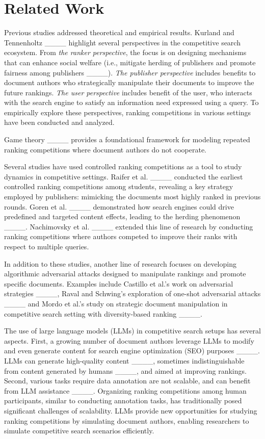 \section{Related Work}
Previous studies addressed theoretical and empirical results. Kurland and Tennenholtz ____ highlight several perspectives in the competitive search ecosystem. From \textit{the ranker perspective}, the focus is on designing mechanisms that can enhance social welfare (i.e., mitigate herding of publishers and promote fairness among publishers ____). \textit{The publisher perspective} includes benefits to document authors who strategically manipulate their documents to improve the future rankings. \textit{The user perspective} includes benefit of the user, who interacts with the search engine to satisfy an information need expressed using a query. To empirically explore these perspectives, ranking competitions in various settings have been conducted and analyzed.

 Game theory ____ provides a foundational framework for modeling repeated ranking competitions where document authors do not cooperate.

Several studies have used controlled ranking competitions as a tool to study dynamics in competitive settings. Raifer et al. ____ conducted the earliest controlled ranking competitions among students, revealing a key strategy employed by publishers: mimicking the documents most highly ranked in previous rounds. Goren et al. ____ demonstrated how search engines could drive predefined and targeted content effects, leading to the herding phenomenon ____. Nachimovsky et al. ____ extended this line of research by conducting ranking competitions where authors competed to improve their ranks with respect to multiple queries.

In addition to these studies, another line of research focuses on developing algorithmic adversarial attacks designed to manipulate rankings and promote specific documents. Examples include Castillo et al.'s work on adversarial strategies ____, Raval and Schwing's exploration of one-shot adversarial attacks ____ and Mordo et al.'s study on strategic document manipulation in competitive search setting with diversity-based ranking ____.


 The use of large language models (LLMs) in competitive search setups has several aspects. First, a growing number of document authors leverage LLMs to modify and even generate content for search engine optimization (SEO) purposes ____. LLMs can generate high-quality content ____, sometimes indistinguishable from content generated by humans ____, and aimed at improving rankings. Second, various tasks require data annotation are not scalable, and can benefit from LLM assistance ____. Organizing ranking competitions among human participants, similar to conducting annotation tasks, has traditionally posed significant challenges of scalability. LLMs provide new opportunities for studying ranking competitions by simulating document authors, enabling researchers to simulate competitive search scenarios efficiently.

